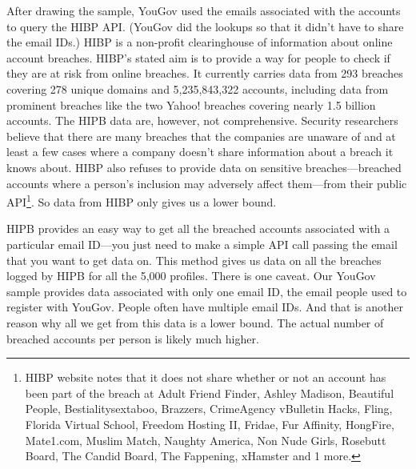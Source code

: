 \documentclass[sigconf]{acmart}
\begin{document}
After drawing the sample, YouGov used the emails associated with the accounts to query the HIBP API. (YouGov did the lookups so that it didn't have to share the email IDs.) HIBP is a non-profit clearinghouse of information about online account breaches. HIBP's stated aim is to provide a way for people to check if they are at risk from online breaches. It currently carries data from 293 breaches covering 278 unique domains and 5,235,843,322 accounts, including data from prominent breaches like the two Yahoo! breaches covering nearly 1.5 billion accounts. The HIPB data are, however, not comprehensive. Security researchers believe that there are many breaches that the companies are unaware of and at least a few cases where a company doesn't share information about a breach it knows about. HIBP also refuses to provide data on sensitive breaches---breached accounts where a person's inclusion may adversely affect them---from their public API\footnote{HIBP website notes that it does not share whether or not an account has been part of the breach at Adult Friend Finder, Ashley Madison, Beautiful People, Bestialitysextaboo, Brazzers, CrimeAgency vBulletin Hacks, Fling, Florida Virtual School, Freedom Hosting II, Fridae, Fur Affinity, HongFire, Mate1.com, Muslim Match, Naughty America, Non Nude Girls, Rosebutt Board, The Candid Board, The Fappening, xHamster and 1 more.}.  So data from HIBP only gives us a lower bound.

HIPB provides an easy way to get all the breached accounts associated with a particular email ID---you just need to make a simple API call passing the email that you want to get data on. This method gives us data on all the breaches logged by HIPB for all the 5,000 profiles. There is one caveat.  Our YouGov sample provides data associated with only one email ID, the email people used to register with YouGov. People often have multiple email IDs. And that is another reason why all we get from this data is a lower bound. The actual number of breached accounts per person is likely much higher. 
\end{document}
